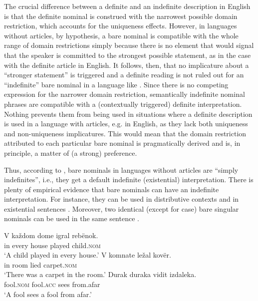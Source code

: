 \documentclass[output=paper]{langscibook}
\begin{document}
The crucial difference between a definite and an indefinite description in English is that the definite nominal is construed with the narrowest possible domain restriction, which accounts for the uniqueness effects. However, in languages without articles, by hypothesis, a bare nominal is compatible with the whole range of domain restrictions simply because there is no element that would signal that the speaker is committed to the strongest possible statement, as in the case with the definite article in English. It follows, then, that no implicature about a ``stronger statement'' is triggered and a definite reading is not ruled out for an ``indefinite'' bare nominal in a language like . Since there is no competing expression for the narrower domain restriction, semantically indefinite nominal phrases are compatible with a (contextually triggered) definite interpretation. Nothing prevents them from being used in situations where a definite description is used in a language with articles, e.g. in English, as they lack both uniqueness and non-uniqueness implicatures. This would mean that the domain restriction attributed to each particular bare nominal is pragmatically derived and is, in principle, a matter of (a strong) preference.

Thus, according to \citet[1006]{Heim2011}, bare nominals in languages without articles are ``simply indefinites'', i.e., they get a default indefinite (existential) interpretation. There is plenty of empirical evidence that
 bare nominals can have an indefinite interpretation. For instance, they can be used in distributive contexts  and in existential sentences . Moreover, two identical (except for case) bare singular nominals can be used in the same sentence .

\ea \label{ex:seres:28}
\gll	V	každom	dome		igral		rebënok. \\
	   	in	every		house	played	child.\textsc{nom}\\
	\glt `A child played in every house.'
\ex \label{ex:seres:29}
\gll	V	komnate	ležal	kovër. \\
in 	room 		lied 	carpet.\textsc{nom}\\
\glt`There was a carpet in the room.'
\ex \label{ex:seres:30}
\gll	Durak		duraka	vidit	izdaleka. \\
fool.\textsc{nom} 	fool.\textsc{acc} 	sees 	from.afar\\
\glt `A fool sees a fool from afar.'
\z
\end{document}
